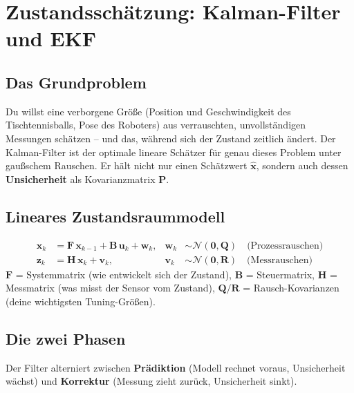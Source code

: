 
\chapter{Zustandsschätzung: Kalman-Filter und EKF}
\label{ch:kalman}

\section{Das Grundproblem}
Du willst eine verborgene Größe (Position und Geschwindigkeit des
Tischtennisballs, Pose des Roboters) aus verrauschten, unvollständigen
Messungen schätzen -- und das, während sich der Zustand zeitlich ändert. Der
Kalman-Filter ist der optimale lineare Schätzer für genau dieses Problem unter
gaußschem Rauschen. Er hält nicht nur einen Schätzwert $\hat{\bm{x}}$, sondern
auch dessen \textbf{Unsicherheit} als Kovarianzmatrix $\bm{P}$.

\section{Lineares Zustandsraummodell}
\begin{align}
\bm{x}_k &= \bm{F}\,\bm{x}_{k-1} + \bm{B}\,\bm{u}_k + \bm{w}_k,
  & \bm{w}_k &\sim \mathcal{N}(\bm{0},\bm{Q})
  \quad\text{(Prozessrauschen)}\\
\bm{z}_k &= \bm{H}\,\bm{x}_k + \bm{v}_k,
  & \bm{v}_k &\sim \mathcal{N}(\bm{0},\bm{R})
  \quad\text{(Messrauschen)}
\end{align}
$\bm{F}$ = Systemmatrix (wie entwickelt sich der Zustand),
$\bm{B}$ = Steuermatrix,
$\bm{H}$ = Messmatrix (was misst der Sensor vom Zustand),
$\bm{Q}/\bm{R}$ = Rausch-Kovarianzen (deine wichtigsten Tuning-Größen).

\section{Die zwei Phasen}
Der Filter alterniert zwischen \textbf{Prädiktion} (Modell rechnet voraus,
Unsicherheit wächst) und \textbf{Korrektur} (Messung zieht zurück, Unsicherheit
sinkt).


